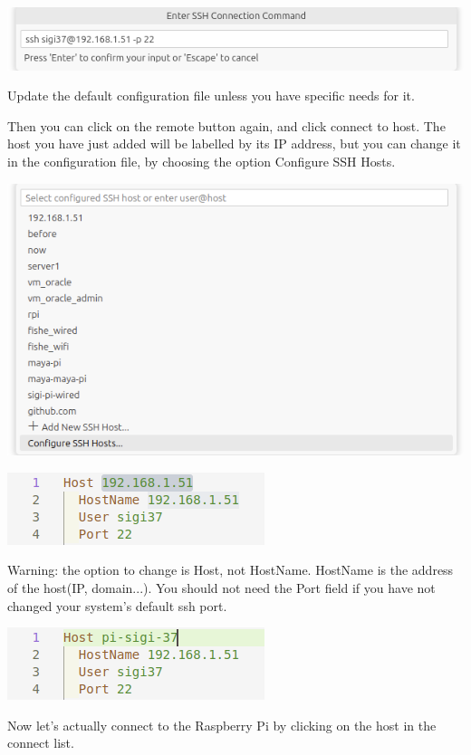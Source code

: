 \documentclass{article}
\begin{document}
\includegraphics[scale=0.5]{img/vsc_ssh.png}

Update the default configuration file unless you have specific needs for it.

Then you can click on the remote button again, and click connect to host. The host you have just
added will be labelled by its IP address, but you can change it in the configuration file,
by choosing the option Configure SSH Hosts.

\includegraphics[scale=0.5]{img/vsc_ssh2.png}

\includegraphics[scale=0.5]{img/vsc_ssh_edit.png}

Warning: the option to change is Host, not HostName. HostName is the address of the host(IP,
domain...). You should not need the Port field if you have not changed your system's default ssh
port.

\includegraphics[scale=0.5]{img/vsc_ssh_edit2.png}

Now let's actually connect to the Raspberry Pi by clicking on the host in the connect list.
\end{document}
